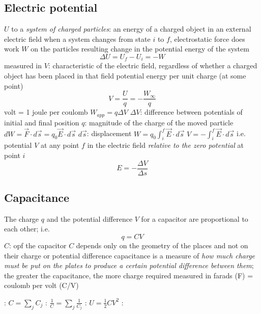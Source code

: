 \documentclass{note}
\begin{document}
\subsection{Electric potential}
\bit
\w {} $U$ to a {\em system of charged
  particles\/}:
    an energy of a charged object in an external electric field
   \bit
   \w when a system changes from state $i$ to $f$, 
   electrostatic force does work $W$ on the particles
   \w resulting change in the potential energy of the system 
   \[\Delta U = U_f -  U_i = - W\]
   \w measured in 
   \eit
\w {} $V$: characteristic of the electric field,
regardless of whether a charged object has been placed in that field
   \bit
   \w potential energy per unit charge (at some point)
       \[ V = \frac{U}{q} = - \frac{W_{\infty}}{q}\]
    volt = 1 joule per coulomb
   \eit
\w {}
   \bit
   \w $W_{app} = q \Delta V$
      \bit
      \w $\Delta V$: difference between potentials of initial and final
         position 
      \w $q$: magnitude of the charge of the moved particle
      \eit
   \eit
\w {}
   \bit
   \w $dW = \vec{F}\cdot d\vec{s} = q_0\vec{E}\cdot d\vec{s}$
     \bit
     \w $d\vec{s}$: displacement
     \eit
   \w $W = q_0 \int^f_i \vec{E}\cdot{}d\vec{s}$
   \w $V = - \int^f_i \vec{E}\cdot d\vec{s}$
     \bit
     \w i.e. potential $V$ at any point $f$
       in the electric field {\em relative to the zero potential\/} at point
   $i$ 
     \eit
   \eit
\w {}
   \[E = -\frac{\Delta V}{\Delta s} \]
\eit

\subsection{Capacitance}
\bit
\w The charge $q$ and the potential difference $V$ for a capacitor are
proportional to each other; i.e.
   \[ q = CV\]
   \bit
   \w $C$:  opf the capacitor
   \w $C$ depends only on the geometry of the places and not on their charge
   or potential difference
   \w capacitance is a measure of {\em how much charge must be put on the
   plates to produce a certain potential difference between them\/}; the
   greater the capacitance, the more charge required
   \w measured in farads (F) = coulomb per volt (C/V)
   \eit

\w {}
   \bit
   \w 
   \eit
\w {}
  \bit
  \w {}: $C = \sum_j{C_j}$
  \w {}: $\frac{1}{C} = \sum_j{\frac{1}{C_j}}$
  \eit
\w {}
  \bit
  \w {}: $U = \frac{1}{2}CV^2$
  \eit
\w {}:
\eit
\end{document}

